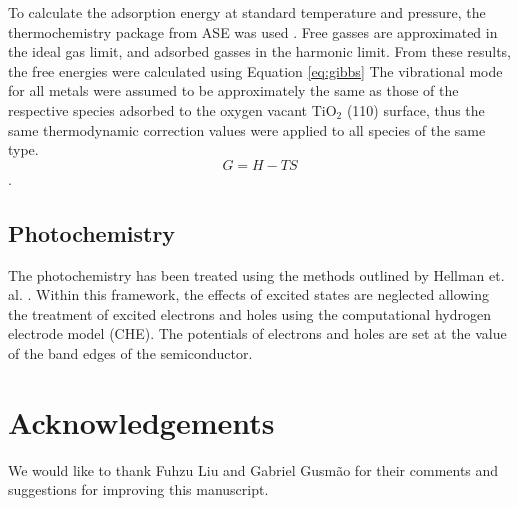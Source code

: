 To calculate the adsorption energy at standard temperature and pressure, the thermochemistry package from ASE was used \cite{ase-paper}. Free gasses are approximated in the ideal gas limit, and adsorbed gasses in the harmonic limit. 
From these results, the free energies were calculated using Equation \ref{eq:gibbs} The vibrational mode for all metals were assumed to be approximately the same as those of the respective species adsorbed to the oxygen vacant TiO$_2$ (110) surface, thus the same thermodynamic correction values were applied to all species of the same type.
\begin{equation}
    G=H-TS
    \label{eq:gibbs}
\end{equation}. 

\subsection{Photochemistry}
\label{sec:PEC_methods}
The photochemistry has been treated using the methods outlined by Hellman et. al. \cite{Hellman2017}. Within this framework, the effects of excited states are neglected allowing the treatment of excited electrons and holes using the computational hydrogen electrode model (CHE). The potentials of electrons and holes are set at the value of the band edges of the semiconductor.

\section{Acknowledgements}
We would like to thank Fuhzu Liu and Gabriel Gusm\~ao for their comments and suggestions for improving this manuscript.



\appendix




